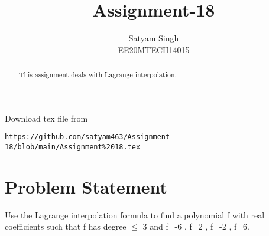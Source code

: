 \documentclass[journal,12pt,twocolumn]{IEEEtran}
\begin{document}
\renewcommand{\thefigure}{\theproblem}
\def\putbox#1#2#3{\makebox[0in][l]{\makebox[#1][l]{}\raisebox{\baselineskip}[0in][0in]{\raisebox{#2}[0in][0in]{#3}}}}
     \def\rightbox#1{\makebox[0in][r]{#1}}
     \def\centbox#1{\makebox[0in]{#1}}
     \def\topbox#1{\raisebox{-\baselineskip}[0in][0in]{#1}}
     \def\midbox#1{\raisebox{-0.5\baselineskip}[0in][0in]{#1}}
\vspace{3cm}
\title{Assignment-18}
\author{Satyam Singh \\ EE20MTECH14015}
\maketitle
\newpage
\bigskip
\renewcommand{\thefigure}{\theenumi}
\renewcommand{\thetable}{\theenumi}
\begin{abstract}
This assignment deals with Lagrange interpolation.
\end{abstract}
Download  tex file from 
\begin{lstlisting}
https://github.com/satyam463/Assignment-18/blob/main/Assignment%2018.tex
\end{lstlisting}
\section{Problem Statement}
Use the Lagrange interpolation formula to find a polynomial f with real coefficients such that f has degree $\leq$ 3 and f=-6 , f=2 , f=-2 , f=6.
\end{document}
